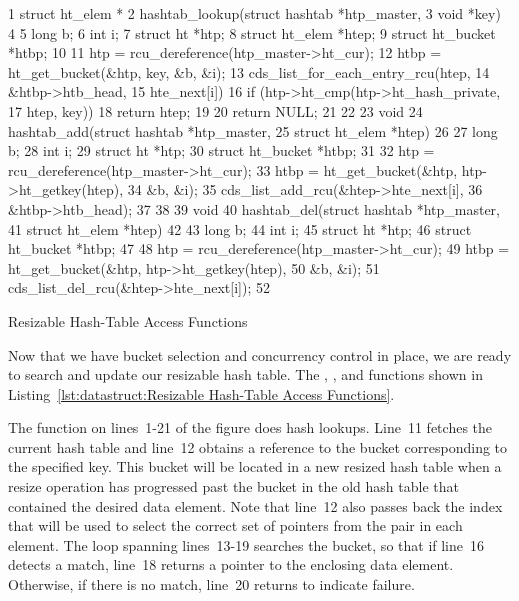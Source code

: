 \begin{listing}[tb]
{ \scriptsize
\begin{verbbox}
 1 struct ht_elem *
 2 hashtab_lookup(struct hashtab *htp_master,
 3                void *key)
 4 {
 5   long b;
 6   int i;
 7   struct ht *htp;
 8   struct ht_elem *htep;
 9   struct ht_bucket *htbp;
10 
11   htp = rcu_dereference(htp_master->ht_cur);
12   htbp = ht_get_bucket(&htp, key, &b, &i);
13   cds_list_for_each_entry_rcu(htep,
14                               &htbp->htb_head,
15                               hte_next[i]) {
16     if (htp->ht_cmp(htp->ht_hash_private,
17                     htep, key))
18       return htep;
19   }
20   return NULL;
21 }
22 
23 void
24 hashtab_add(struct hashtab *htp_master,
25             struct ht_elem *htep)
26 {
27   long b;
28   int i;
29   struct ht *htp;
30   struct ht_bucket *htbp;
31 
32   htp = rcu_dereference(htp_master->ht_cur);
33   htbp = ht_get_bucket(&htp, htp->ht_getkey(htep),
34                        &b, &i);
35   cds_list_add_rcu(&htep->hte_next[i],
36                    &htbp->htb_head);
37 }
38 
39 void
40 hashtab_del(struct hashtab *htp_master,
41             struct ht_elem *htep)
42 {
43   long b;
44   int i;
45   struct ht *htp;
46   struct ht_bucket *htbp;
47 
48   htp = rcu_dereference(htp_master->ht_cur);
49   htbp = ht_get_bucket(&htp, htp->ht_getkey(htep),
50                        &b, &i);
51   cds_list_del_rcu(&htep->hte_next[i]);
52 }
\end{verbbox}
}
\centering
\theverbbox
\caption{Resizable Hash-Table Access Functions}
\label{lst:datastruct:Resizable Hash-Table Access Functions}
\end{listing}

Now that we have bucket selection and concurrency control in place,
we are ready to search and update our resizable hash table.
The , , and 
functions shown in
Listing~\ref{lst:datastruct:Resizable Hash-Table Access Functions}.

The  function on lines~1-21 of the figure does
hash lookups.
Line~11 fetches the current hash table and line~12 obtains a reference
to the bucket corresponding to the specified key.
This bucket will be located in a new resized hash table when a
resize operation has progressed past the bucket in the old hash
table that contained the desired data element.
Note that line~12 also passes back the index that will be used to
select the correct set of pointers from the pair in each element.
The loop spanning lines~13-19 searches the bucket, so that if line~16
detects a match, line~18 returns a pointer to the enclosing data element.
Otherwise, if there is no match, line~20 returns  to indicate
failure.

